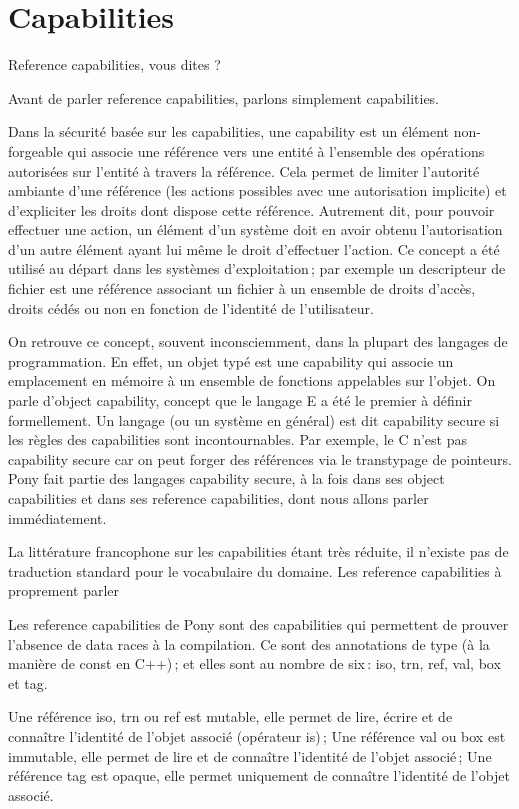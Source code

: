 \documentclass[11pt, oneside]{article}   	%
\begin{document}
\section{Capabilities}
 Reference capabilities, vous dites ?

Avant de parler reference capabilities, parlons simplement capabilities.

Dans la sécurité basée sur les capabilities, une capability est un élément non-forgeable qui associe une référence vers une entité à l’ensemble des opérations autorisées sur l’entité à travers la référence. Cela permet de limiter l’autorité ambiante d’une référence (les actions possibles avec une autorisation implicite) et d’expliciter les droits dont dispose cette référence. Autrement dit, pour pouvoir effectuer une action, un élément d’un système doit en avoir obtenu l’autorisation d’un autre élément ayant lui même le droit d’effectuer l’action. Ce concept a été utilisé au départ dans les systèmes d’exploitation ; par exemple un descripteur de fichier est une référence associant un fichier à un ensemble de droits d’accès, droits cédés ou non en fonction de l’identité de l’utilisateur.

On retrouve ce concept, souvent inconsciemment, dans la plupart des langages de programmation. En effet, un objet typé est une capability qui associe un emplacement en mémoire à un ensemble de fonctions appelables sur l’objet. On parle d’object capability, concept que le langage E a été le premier à définir formellement. Un langage (ou un système en général) est dit capability secure si les règles des capabilities sont incontournables. Par exemple, le C n’est pas capability secure car on peut forger des références via le transtypage de pointeurs.
Pony fait partie des langages capability secure, à la fois dans ses object capabilities et dans ses reference capabilities, dont nous allons parler immédiatement.

La littérature francophone sur les capabilities étant très réduite, il n’existe pas de traduction standard pour le vocabulaire du domaine.
Les reference capabilities à proprement parler

Les reference capabilities de Pony sont des capabilities qui permettent de prouver l’absence de data races à la compilation. Ce sont des annotations de type (à la manière de const en C++) ; et elles sont au nombre de six : iso, trn, ref, val, box et tag.

    Une référence iso, trn ou ref est mutable, elle permet de lire, écrire et de connaître l’identité de l’objet associé (opérateur is) ;
    Une référence val ou box est immutable, elle permet de lire et de connaître l’identité de l’objet associé ;
    Une référence tag est opaque, elle permet uniquement de connaître l’identité de l’objet associé.
\end{document}
